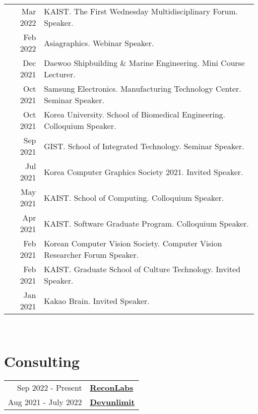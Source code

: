 \documentclass[letterpaper,10pt]{article} %
\newcommand{\blankline}{\quad\pagebreak[2]}
\begin{document}
{\begin{tabular}{r|p{11cm}}
Mar 2022 & KAIST. The First Wednesday Multidisciplinary Forum. Speaker.\\
Feb 2022 & Asiagraphics. Webinar Speaker.\\
Dec 2021 & Daewoo Shipbuilding \& Marine Engineering. Mini Course Lecturer.\\
Oct 2021 & Samsung Electronics. Manufacturing Technology Center. Seminar Speaker.\\
Oct 2021 & Korea University. School of Biomedical Engineering. Colloquium Speaker.\\
Sep 2021 & GIST. School of Integrated Technology. Seminar Speaker.\\
Jul 2021 & Korea Computer Graphics Society 2021. Invited Speaker.\\
May 2021 & KAIST. School of Computing. Colloquium Speaker.\\
Apr 2021 & KAIST. Software Graduate Program. Colloquium Speaker.\\
Feb 2021 & Korean Computer Vision Society. Computer Vision Researcher Forum Speaker.\\
Feb 2021 & KAIST. Graduate School of Culture Technology. Invited Speaker.\\
Jan 2021 & Kakao Brain. Invited Speaker.\\
\end{tabular}\\

\blankline



\section{Consulting}

\begin{tabular}{r|p{14cm}}
Sep 2022 - Present & \href{https://en.reconlabs.ai/}{\textbf{ReconLabs}}\\
Aug 2021 - July 2022 & \href{https://www.devunlimit.com/}{\textbf{Devunlimit}}\\
\end{tabular}\\



\iffalse

}
\end{document}
